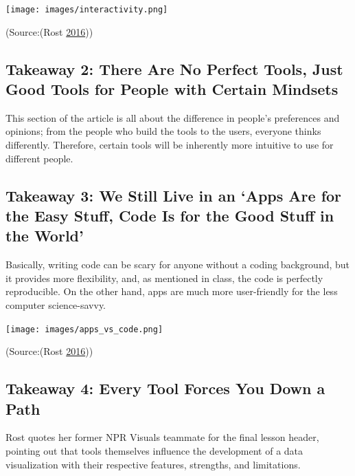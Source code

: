\documentclass[]{book}
\begin{document}
\texttt{[image: images/interactivity.png]}

(Source:(Rost \protect\hyperlink{ref-different_tools}{2016}))

\hypertarget{takeaway-2-there-are-no-perfect-tools-just-good-tools-for-people-with-certain-mindsets}{%
\subsection{Takeaway 2: There Are No Perfect Tools, Just Good Tools for People with Certain Mindsets}\label{takeaway-2-there-are-no-perfect-tools-just-good-tools-for-people-with-certain-mindsets}}

This section of the article is all about the difference in people's preferences and opinions; from the people who build the tools to the users, everyone thinks differently. Therefore, certain tools will be inherently more intuitive to use for different people.

\hypertarget{takeaway-3-we-still-live-in-an-apps-are-for-the-easy-stuff-code-is-for-the-good-stuff-in-the-world}{%
\subsection{Takeaway 3: We Still Live in an `Apps Are for the Easy Stuff, Code Is for the Good Stuff in the World'}\label{takeaway-3-we-still-live-in-an-apps-are-for-the-easy-stuff-code-is-for-the-good-stuff-in-the-world}}

Basically, writing code can be scary for anyone without a coding background, but it provides more flexibility, and, as mentioned in class, the code is perfectly reproducible. On the other hand, apps are much more user-friendly for the less computer science-savvy.

\texttt{[image: images/apps\_vs\_code.png]}

(Source:(Rost \protect\hyperlink{ref-different_tools}{2016}))

\hypertarget{takeaway-4-every-tool-forces-you-down-a-path}{%
\subsection{Takeaway 4: Every Tool Forces You Down a Path}\label{takeaway-4-every-tool-forces-you-down-a-path}}

Rost quotes her former NPR Visuals teammate for the final lesson header, pointing out that tools themselves influence the development of a data visualization with their respective features, strengths, and limitations.
\end{document}
